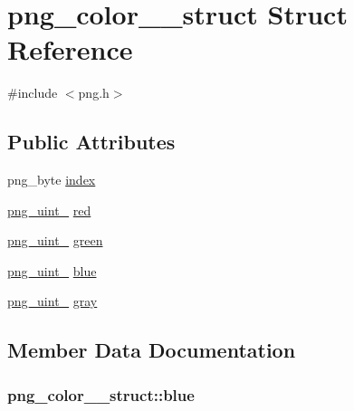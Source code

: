 \hypertarget{structpng__color__16__struct}{}\section{png\+\_\+color\+\_\+\_\+struct Struct Reference}
\label{structpng__color__16__struct}


{\ttfamily \#include $<$png.\+h$>$}

\subsection*{Public Attributes}
\begin{DoxyCompactItemize}
\item 
png\+\_\+byte \hyperlink{structpng__color__16__struct_a44a918da0d9a50cf94fcad5a3c741ee0}{index}
\item 
\hyperlink{pngrutil_8c_a7b67546e4211b127dd370e8ef197bc3f}{png\+\_\+uint\+\_} \hyperlink{structpng__color__16__struct_a069bad345aefbe4eab29fcc1d8af91e6}{red}
\item 
\hyperlink{pngrutil_8c_a7b67546e4211b127dd370e8ef197bc3f}{png\+\_\+uint\+\_} \hyperlink{structpng__color__16__struct_af01259ffd46c78eff9b1ad584a295126}{green}
\item 
\hyperlink{pngrutil_8c_a7b67546e4211b127dd370e8ef197bc3f}{png\+\_\+uint\+\_} \hyperlink{structpng__color__16__struct_afd68833319d436582aa5911de7cdd46b}{blue}
\item 
\hyperlink{pngrutil_8c_a7b67546e4211b127dd370e8ef197bc3f}{png\+\_\+uint\+\_} \hyperlink{structpng__color__16__struct_a660a572a0a2f4094408f2fecb61571ac}{gray}
\end{DoxyCompactItemize}


\subsection{Member Data Documentation}
\hypertarget{structpng__color__16__struct_afd68833319d436582aa5911de7cdd46b}{}
\subsubsection[{blue}]{ png\+\_\+color\+\_\+\_\+struct\+::blue}\label{structpng__color__16__struct_afd68833319d436582aa5911de7cdd46b}
\hypertarget{structpng__color__16__struct_a660a572a0a2f4094408f2fecb61571ac}{}
